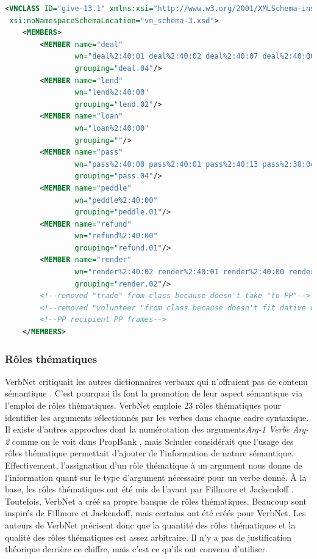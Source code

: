 \begin{lstlisting}[language=XML, caption = Les membres d'une classe, label=membre]
<VNCLASS ID="give-13.1" xmlns:xsi="http://www.w3.org/2001/XMLSchema-instance"
 xsi:noNamespaceSchemaLocation="vn_schema-3.xsd">
    <MEMBERS>
        <MEMBER name="deal" 
				wn="deal%2:40:01 deal%2:40:02 deal%2:40:07 deal%2:40:06" 
				grouping="deal.04"/>
        <MEMBER name="lend" 
				wn="lend%2:40:00" 
				grouping="lend.02"/>
        <MEMBER name="loan" 
				wn="loan%2:40:00" 
				grouping=""/>
        <MEMBER name="pass" 
				wn="pass%2:40:00 pass%2:40:01 pass%2:40:13 pass%2:38:04" 
				grouping="pass.04"/>
        <MEMBER name="peddle" 
				wn="peddle%2:40:00" 
				grouping="peddle.01"/>
        <MEMBER name="refund" 
				wn="refund%2:40:00" 
				grouping="refund.01"/>
        <MEMBER name="render" 
				wn="render%2:40:02 render%2:40:01 render%2:40:00 render%2:40:03" 
				grouping="render.02"/>
        <!--removed "trade" from class because doesn't take "to-PP"-->
        <!--removed "volunteer "from class because doesn't fit dative or-->
        <!--PP recipient PP frames-->
    </MEMBERS>
\end{lstlisting}

\subsubsection{Rôles thématiques}
VerbNet critiquait les autres dictionnaires verbaux qui n'offraient pas de contenu sémantique \citep{SchulerVerbnetBroadcoverageComprehensive2005}. C'est pourquoi ils font la promotion de leur aspect sémantique via l'emploi de rôles thématiques. VerbNet emploie 23 rôles thématiques pour identifier les arguments sélectionnés par les verbes dans chaque cadre syntaxique. Il existe d'autres approches dont la numérotation des arguments\emph{Arg-1 Verbe Arg-2} comme on le voit dans PropBank \citep{PalmerPropositionBankAnnotated2005}, mais Schuler considérait que l'usage des rôles thématique permettait d'ajouter de l'information de nature sémantique. Effectivement, l'assignation d'un rôle thématique à un argument nous donne de l'information quant sur le type d'argument nécessaire pour un verbe donné. À la base, les rôles thématiques ont été mis de l'avant par Fillmore \cite{fillmore:case} et Jackendoff \cite{Jackendoff1972-JACSII-2}. Toutefois, VerbNet a créé sa propre banque de rôles thématiques. Beaucoup sont inspirés de Fillmore et Jackendoff, mais certains ont été créés pour VerbNet. Les auteurs de VerbNet précisent donc que la quantité des rôles thématiques et la qualité des rôles thématiques est assez arbitraire. Il n'y a pas de justification théorique derrière ce chiffre, mais c'est ce qu'ils ont convenu d'utiliser.

